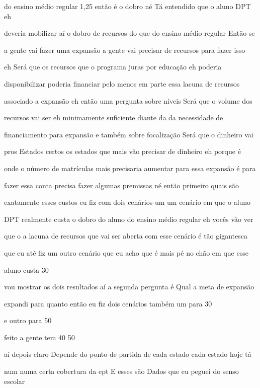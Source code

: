 \documentclass[a4paper,12pt]{article}
\begin{document}
do ensino médio regular 1,25 então é o dobro né Tá entendido que o aluno DPT eh

deveria mobilizar aí o dobro de recursos do que do ensino médio regular Então se

a gente vai fazer uma expansão a gente vai precisar de recursos para fazer isso

eh Será que os recursos que o programa juras por educação eh poderia

disponibilizar poderia financiar pelo menos em parte essa lacuna de recursos

associado a expansão eh então uma pergunta sobre níveis Será que o volume dos

recursos vai ser eh minimamente suficiente diante da da necessidade de

financiamento para expansão e também sobre focalização Será que o dinheiro vai

pros Estados certos os estados que mais vão precisar de dinheiro eh porque é

onde o número de matrículas mais precisaria aumentar para essa expansão é para

fazer essa conta precisa fazer algumas premissas né então primeiro quais são

exatamente esses custos eu fiz com dois cenários um um cenário em que o aluno

DPT realmente custa o dobro do aluno do ensino médio regular eh vocês vão ver

que o a lacuna de recursos que vai ser aberta com esse cenário é tão gigantesca

que eu até fiz um outro cenário que eu acho que é mais pé no chão em que esse

aluno custa 30%

vou mostrar os dois resultados aí a segunda pergunta é Qual a meta de expansão

expandi para quanto então eu fiz dois cenários também um para 30%

e outro para 50%

feito a gente tem 40 50%

aí depois claro Depende do ponto de partida de cada estado cada estado hoje tá

num numa certa cobertura da ept E esses são Dados que eu peguei do senso escolar
\end{document}
